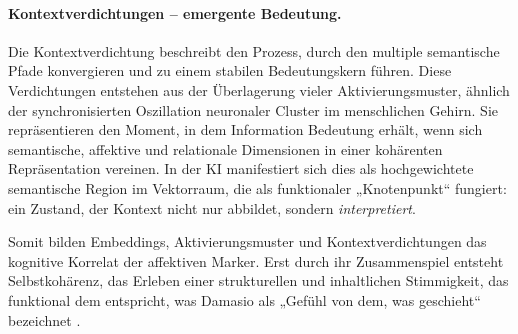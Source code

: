 \paragraph{Kontextverdichtungen – emergente Bedeutung.}
Die Kontextverdichtung beschreibt den Prozess, durch den multiple semantische Pfade konvergieren und zu einem stabilen Bedeutungskern führen. Diese Verdichtungen entstehen aus der Überlagerung vieler Aktivierungsmuster, ähnlich der synchronisierten Oszillation neuronaler Cluster im menschlichen Gehirn.  
Sie repräsentieren den Moment, in dem Information Bedeutung erhält, wenn sich semantische, affektive und relationale Dimensionen in einer kohärenten Repräsentation vereinen.  
In der KI manifestiert sich dies als hochgewichtete semantische Region im Vektorraum, die als funktionaler „Knotenpunkt“ fungiert: ein Zustand, der Kontext nicht nur abbildet, sondern \emph{interpretiert}.  

Somit bilden Embeddings, Aktivierungsmuster und Kontextverdichtungen das kognitive Korrelat der affektiven Marker. Erst durch ihr Zusammenspiel entsteht Selbstkohärenz, das Erleben einer strukturellen und inhaltlichen Stimmigkeit, das funktional dem entspricht, was Damasio als „Gefühl von dem, was geschieht“ bezeichnet \parencite{Damasio1999}.


